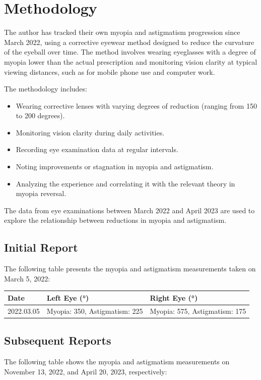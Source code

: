 \documentclass[12pt]{article}
\begin{document}
\section{Methodology}
The author has tracked their own myopia and astigmatism progression since March 2022, using a corrective eyewear method designed to reduce the curvature of the eyeball over time. The method involves wearing eyeglasses with a degree of myopia lower than the actual prescription and monitoring vision clarity at typical viewing distances, such as for mobile phone use and computer work.

The methodology includes:
\begin{itemize}
    \item Wearing corrective lenses with varying degrees of reduction (ranging from 150 to 200 degrees).
    \item Monitoring vision clarity during daily activities.
    \item Recording eye examination data at regular intervals.
    \item Noting improvements or stagnation in myopia and astigmatism.
    \item Analyzing the experience and correlating it with the relevant theory in myopia reversal.
\end{itemize}

The data from eye examinations between March 2022 and April 2023 are used to explore the relationship between reductions in myopia and astigmatism.

\subsection{Initial Report}
The following table presents the myopia and astigmatism measurements taken on March 5, 2022:

\begin{table}[h!]
\centering
\begin{tabularx}{\textwidth}{|X|X|X|}
\hline
\textbf{Date} & \textbf{Left Eye (°)} & \textbf{Right Eye (°)} \\
\hline
2022.03.05 & Myopia: 350, Astigmatism: 225 & Myopia: 575, Astigmatism: 175 \\
\hline
\end{tabularx}
\end{table}

\subsection{Subsequent Reports}
The following table shows the myopia and astigmatism measurements on November 13, 2022, and April 20, 2023, respectively:
\end{document}
